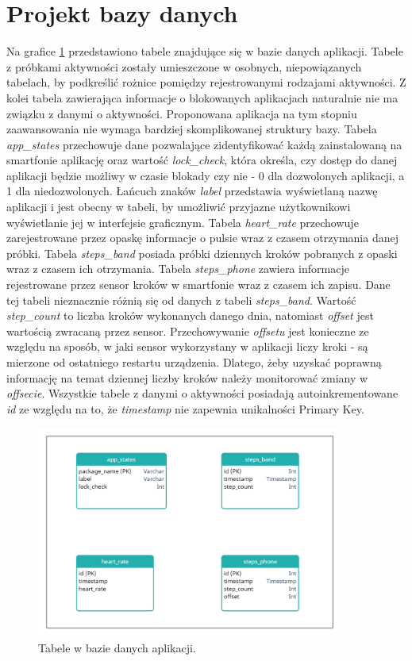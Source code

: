 \section{Projekt bazy danych}
Na grafice \ref{db_tables} przedstawiono tabele znajdujące się w bazie danych aplikacji. Tabele z próbkami aktywności zostały umieszczone w osobnych, niepowiązanych tabelach, by podkreślić rożnice pomiędzy rejestrowanymi rodzajami aktywności. Z kolei tabela zawierająca informacje o blokowanych aplikacjach naturalnie nie ma związku z danymi o aktywności. Proponowana aplikacja na tym stopniu zaawansowania nie wymaga bardziej skomplikowanej struktury bazy.
\newline\newline
\indent Tabela \textit{app\_states} przechowuje dane pozwalające zidentyfikować każdą zainstalowaną na smartfonie aplikację oraz wartość \textit{lock\_check}, która określa, czy dostęp do danej aplikacji będzie możliwy w czasie blokady czy nie - 0 dla dozwolonych aplikacji, a 1 dla niedozwolonych. Łańcuch znaków \textit{label} przedstawia wyświetlaną nazwę aplikacji i jest obecny w tabeli, by umożliwić przyjazne użytkownikowi wyświetlanie jej w interfejsie graficznym.
\newline\newline
\indent Tabela \textit{heart\_rate} przechowuje zarejestrowane przez opaskę informacje o pulsie wraz z czasem otrzymania danej próbki. Tabela \textit{steps\_band} posiada próbki dziennych kroków pobranych z opaski wraz z czasem ich otrzymania. Tabela \textit{steps\_phone} zawiera informacje rejestrowane przez sensor kroków w smartfonie wraz z czasem ich zapisu. Dane tej tabeli nieznacznie różnią się od danych z tabeli \textit{steps\_band}. Wartość \textit{step\_count} to liczba kroków wykonanych danego dnia, natomiast \textit{offset} jest wartością zwracaną przez sensor. Przechowywanie \textit{offsetu} jest konieczne ze względu na sposób, w jaki sensor wykorzystany w aplikacji liczy kroki - są mierzone od ostatniego restartu urządzenia. Dlatego, żeby uzyskać poprawną informację na temat dziennej liczby kroków należy monitorować zmiany w \textit{offsecie}. Wszystkie tabele z danymi o aktywności posiadają autoinkrementowane \textit{id} ze względu na to, że \textit{timestamp} nie zapewnia unikalności Primary Key.

\begin{figure}[H]
    \begin{center}
        \includegraphics[width=0.9\textwidth]{DBTables.png}
    \end{center}
    \caption{{\color{dgray}Tabele w bazie danych aplikacji.}} \label{db_tables}
\end{figure}
